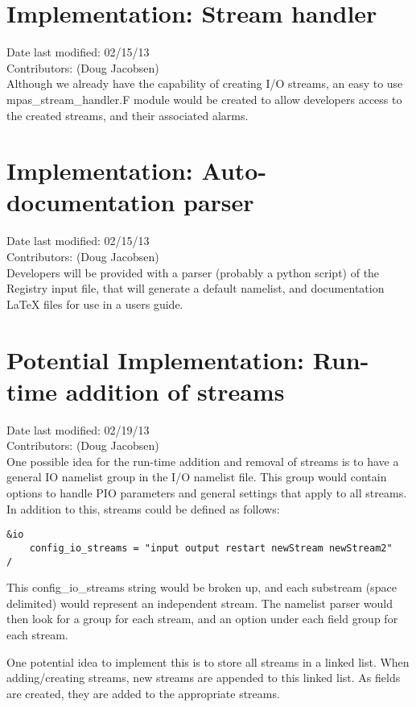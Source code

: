 \documentclass[11pt]{report}
\begin{document}
\section{Implementation: Stream handler}
Date last modified: 02/15/13 \\
Contributors: (Doug Jacobsen) \\

Although we already have the capability of creating I/O streams, an easy to use
mpas\_stream\_handler.F module would be created to allow developers access to
the created streams, and their associated alarms.

\section{Implementation: Auto-documentation parser}
Date last modified: 02/15/13 \\
Contributors: (Doug Jacobsen) \\

Developers will be provided with a parser (probably a python script) of the
Registry input file, that will generate a default namelist, and documentation
LaTeX files for use in a users guide.

\section{Potential Implementation: Run-time addition of streams}
Date last modified: 02/19/13 \\
Contributors: (Doug Jacobsen) \\

One possible idea for the run-time addition and removal of streams is to have a
general IO namelist group in the I/O namelist file. This group would contain
options to handle PIO parameters and general settings that apply to all
streams. In addition to this, streams could be defined as follows:

\begin{lstlisting}
&io
	config_io_streams = "input output restart newStream newStream2"
/
\end{lstlisting}

This config\_io\_streams string would be broken up, and each substream (space
delimited) would represent an independent stream. The namelist parser would then look
for a group for each stream, and an option under each field group for each
stream.

One potential idea to implement this is to store all streams in a linked list.
When adding/creating streams, new streams are appended to this linked list.  As
fields are created, they are added to the appropriate streams.
\end{document}
